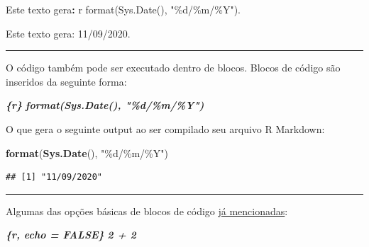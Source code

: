 \documentclass[
]{book}
\newenvironment{Shaded}{\begin{snugshade}}{\end{snugshade}}
\newcommand{\DataTypeTok}[1]{\textcolor[rgb]{0.13,0.29,0.53}{#1}}
\newcommand{\InformationTok}[1]{\textcolor[rgb]{0.56,0.35,0.01}{\textbf{\textit{#1}}}}
\newcommand{\KeywordTok}[1]{\textcolor[rgb]{0.13,0.29,0.53}{\textbf{#1}}}
\newcommand{\NormalTok}[1]{#1}
\newcommand{\OperatorTok}[1]{\textcolor[rgb]{0.81,0.36,0.00}{\textbf{#1}}}
\newcommand{\StringTok}[1]{\textcolor[rgb]{0.31,0.60,0.02}{#1}}
\begin{document}
\begin{Shaded}
\begin{Highlighting}[]
\NormalTok{Este texto gera}\OperatorTok{:}\StringTok{ \textasciigrave{}}\DataTypeTok{r format(Sys.Date(), "\%d/\%m/\%Y")}\StringTok{\textasciigrave{}}\NormalTok{.}
\end{Highlighting}
\end{Shaded}

Este texto gera: 11/09/2020.

\begin{center}\rule{0.5\linewidth}{0.5pt}\end{center}

O código também pode ser executado dentro de blocos. Blocos de código são inseridos da seguinte forma:

\begin{Shaded}
\begin{Highlighting}[]
\InformationTok{\textasciigrave{}\textasciigrave{}\textasciigrave{}\{r\}}
\InformationTok{format(Sys.Date(), "\%d/\%m/\%Y")}
\InformationTok{\textasciigrave{}\textasciigrave{}\textasciigrave{}}
\end{Highlighting}
\end{Shaded}

O que gera o seguinte output ao ser compilado seu arquivo R Markdown:

\begin{Shaded}
\begin{Highlighting}[]
\KeywordTok{format}\NormalTok{(}\KeywordTok{Sys.Date}\NormalTok{(), }\StringTok{"\%d/\%m/\%Y"}\NormalTok{)}
\end{Highlighting}
\end{Shaded}

\begin{verbatim}
## [1] "11/09/2020"
\end{verbatim}

\begin{center}\rule{0.5\linewidth}{0.5pt}\end{center}

Algumas das opções básicas de blocos de código \protect\hyperlink{flags}{já mencionadas}:

\begin{Shaded}
\begin{Highlighting}[]
\InformationTok{\textasciigrave{}\textasciigrave{}\textasciigrave{}\{r, echo = FALSE\}}
\InformationTok{2 + 2}
\InformationTok{\textasciigrave{}\textasciigrave{}\textasciigrave{}}
\end{Highlighting}
\end{Shaded}
\end{document}
